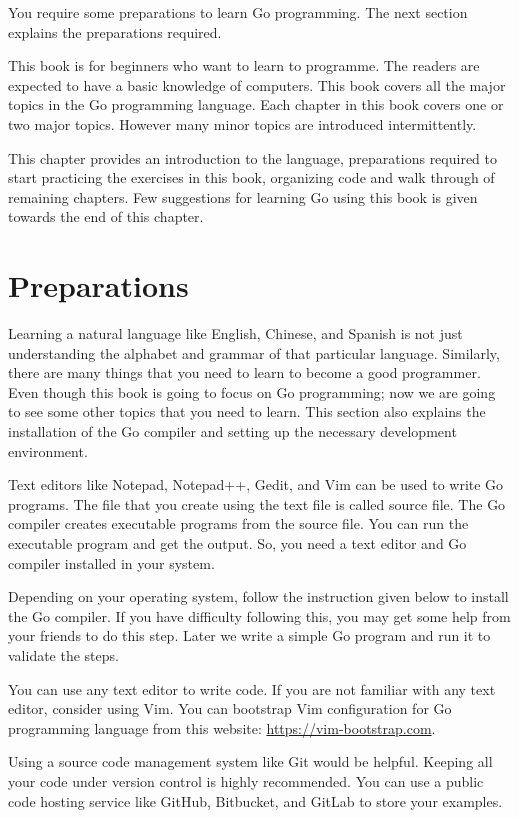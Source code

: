 You require some preparations to learn Go programming. The next section explains
the preparations required.

This book is for beginners who want to learn to programme. The readers are
expected to have a basic knowledge of computers. This book covers all the major
topics in the Go programming language. Each chapter in this book covers one or
two major topics. However many minor topics are introduced intermittently.

This chapter provides an introduction to the language, preparations required to
start practicing the exercises in this book, organizing code and walk through of
remaining chapters. Few suggestions for learning Go using this book is given
towards the end of this chapter.

\section{Preparations}

Learning a natural language like English, Chinese, and Spanish is not just
understanding the alphabet and grammar of that particular language. Similarly,
there are many things that you need to learn to become a good programmer. Even
though this book is going to focus on Go programming; now we are going to see
some other topics that you need to learn. This section also explains the
installation of the Go compiler and setting up the necessary development
environment.

Text editors like Notepad, Notepad++, Gedit, and Vim can be used to write Go
programs. The file that you create using the text file is called source file.
The Go compiler creates executable programs from the source file. You can run
the executable program and get the output. So, you need a text editor and Go
compiler installed in your system.

Depending on your operating system, follow the instruction given below to
install the Go compiler. If you have difficulty following this, you may get some
help from your friends to do this step. Later we write a simple Go program and
run it to validate the steps.

You can use any text editor to write code. If you are not familiar with any text
editor, consider using Vim. You can bootstrap Vim configuration for Go
programming language from this website: \url{https://vim-bootstrap.com}.

Using a source code management system like Git would be helpful. Keeping all
your code under version control is highly recommended. You can use a public code
hosting service like GitHub, Bitbucket, and GitLab to store your examples.

